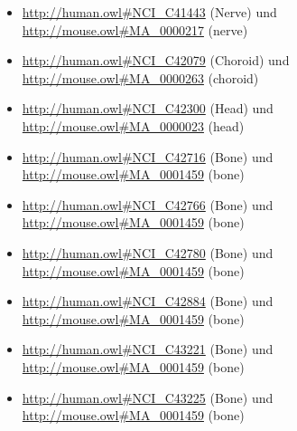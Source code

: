 \begin{itemize}
\item \url{http://human.owl#NCI_C41443} (Nerve\textunderscoreTissue\textunderscoreund\textunderscoreNerve\textunderscoreSheaths) und \url{http://mouse.owl#MA_0000217} (nerve)
\item \url{http://human.owl#NCI_C42079} (Choroid\textunderscorePlexus\textunderscoreEpithelium) und \url{http://mouse.owl#MA_0000263} (choroid)
\item \url{http://human.owl#NCI_C42300} (Head\textunderscoreEars\textunderscoreEyes\textunderscoreNose\textunderscoreund\textunderscoreThroat) und \url{http://mouse.owl#MA_0000023} (head)
\item \url{http://human.owl#NCI_C42716} (Bone\textunderscoreMarrow\textunderscoreMyeloid\textunderscoreStem\textunderscoreCell\textunderscorewith\textunderscorePotential\textunderscoreto\textunderscoreDifferentiate\textunderscoreto\textunderscoreGranulocytic\textunderscoreLineage) und \url{http://mouse.owl#MA_0001459} (bone)
\item \url{http://human.owl#NCI_C42766} (Bone\textunderscoreMarrow\textunderscoreMyeloid\textunderscoreStem\textunderscoreCell\textunderscorewith\textunderscorePotential\textunderscoreto\textunderscoreDifferentiate\textunderscoreto\textunderscoreGranulocytic\textunderscoreund\textunderscoreMonocytic\textunderscoreLineages) und \url{http://mouse.owl#MA_0001459} (bone)
\item \url{http://human.owl#NCI_C42780} (Bone\textunderscoreMarrow\textunderscoreMyeloid\textunderscoreStem\textunderscoreCell\textunderscorewith\textunderscoreSome\textunderscoreCommitment\textunderscoreto\textunderscoreMonocytic\textunderscoreDifferentiation) und \url{http://mouse.owl#MA_0001459} (bone)
\item \url{http://human.owl#NCI_C42884} (Bone\textunderscoreMarrow\textunderscoreStem\textunderscoreCell\textunderscorewith\textunderscoreVariable\textunderscoreLineage\textunderscorePotential) und \url{http://mouse.owl#MA_0001459} (bone)
\item \url{http://human.owl#NCI_C43221} (Bone\textunderscoreMarrow\textunderscoreStem\textunderscoreCell\textunderscoreCommitted\textunderscoreto\textunderscorethe\textunderscoreMegakaryocytic\textunderscoreLineage) und \url{http://mouse.owl#MA_0001459} (bone)
\item \url{http://human.owl#NCI_C43225} (Bone\textunderscoreMarrow\textunderscoreStem\textunderscoreCell\textunderscorewith\textunderscorePotential\textunderscorefor\textunderscoreMegakaryocytic\textunderscoreund\textunderscoreErythroid\textunderscoreDifferentiation) und \url{http://mouse.owl#MA_0001459} (bone)

\end{itemize}
